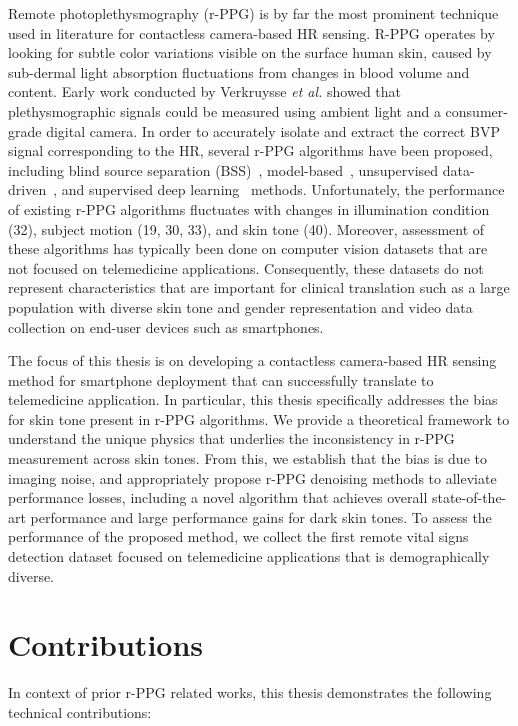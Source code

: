 Remote photoplethysmography (r-PPG) is by far the most prominent technique used in literature for contactless camera-based HR sensing. R-PPG operates by looking for subtle color variations visible on the surface human skin, caused by sub-dermal light absorption fluctuations from changes in blood volume and content. Early work conducted by Verkruysse \textit{et al.} \cite{verkruysse_remote_2008} showed that plethysmographic signals could be measured using ambient light and a consumer-grade digital camera. In order to accurately isolate and extract the correct BVP signal corresponding to the HR, several r-PPG algorithms have been proposed, including blind source separation (BSS)~\cite{}, model-based~\cite{}, unsupervised data-driven~\cite{}, and supervised deep learning~\cite{} methods. Unfortunately, the performance of existing r-PPG algorithms fluctuates with changes in illumination condition (32), subject motion (19, 30, 33), and skin tone (40). Moreover, assessment of these algorithms has typically been done on computer vision datasets that are not focused on telemedicine applications. Consequently, these datasets do not represent characteristics that are important for clinical translation such as a large population with diverse skin tone and gender representation and video data collection on end-user devices such as smartphones. 

The focus of this thesis is on developing a contactless camera-based HR sensing method for smartphone deployment that can successfully translate to telemedicine application. In particular, this thesis specifically addresses the bias for skin tone present in r-PPG algorithms. We provide a theoretical framework to understand the unique physics that underlies the inconsistency in r-PPG measurement across skin tones. From this, we establish that the bias is due to imaging noise, and appropriately propose r-PPG denoising methods to alleviate performance losses, including a novel algorithm that achieves overall state-of-the-art performance and large performance gains for dark skin tones. To assess the performance of the proposed method, we collect the first remote vital signs detection dataset focused on telemedicine applications that is demographically diverse. 

\section{Contributions}

In context of prior r-PPG related works, this thesis demonstrates the following technical contributions:

